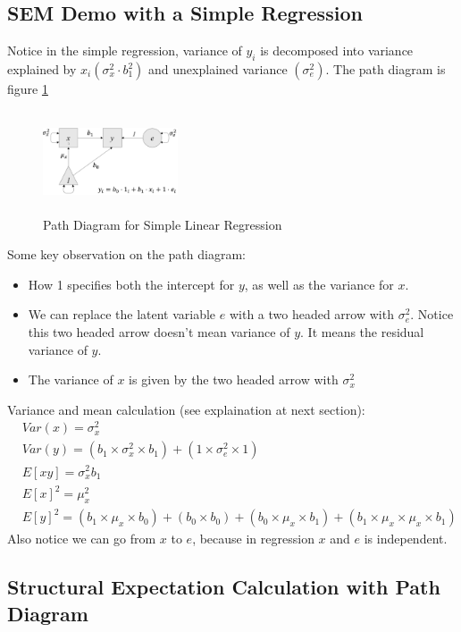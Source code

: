 \subsection{SEM Demo with a Simple Regression} 
Notice in the  simple regression, variance of $y_i$ is decomposed into variance explained by $x_i(\sigma_x^2 \cdot b_1^2)$ and unexplained variance $(\sigma_e^2)$. The path diagram is figure \ref{fig:sem_path_simp_reg}
    \begin{figure}[ht]
        \centering
        \includegraphics[width = 4cm, height = 3cm]{images/001_sem_simp_reg.png}
        \caption{Path Diagram for Simple Linear Regression}
        \label{fig:sem_path_simp_reg}
    \end{figure}
Some key observation on the path diagram: 
    \begin{itemize}
        \item How 1 specifies both the intercept for $y$, as well as the variance for $x$. 
        \item We can replace the latent variable $e$ with a two headed arrow with $\sigma_e^2$. Notice this two headed arrow doesn't mean variance of $y$. It means the residual variance of $y$. 
        \item The variance of $x$ is given by the two headed arrow with $\sigma_x^2$
    \end{itemize}
Variance and mean calculation (see explaination at next section): 
    \begin{align*}
        & Var(x) = \sigma_x^2\\
        & Var(y) = (b_1 \times \sigma_x^2 \times b_1) + (1 \times \sigma_e^2 \times 1)\\
        & E[xy] = \sigma_x^2 b_1\\
        & E[x]^2 = \mu_x^2 \\
        & E[y]^2 = (b_1 \times \mu_x \times b_0) + (b_0 \times b_0) + (b_0 \times \mu_x \times b_1) + (b_1 \times \mu_x \times \mu_x \times b_1)
    \end{align*}
Also notice we can go from $x$ to $e$, because in regression $x$ and $e$ is independent. 


\subsection{Structural Expectation Calculation with Path Diagram} 

